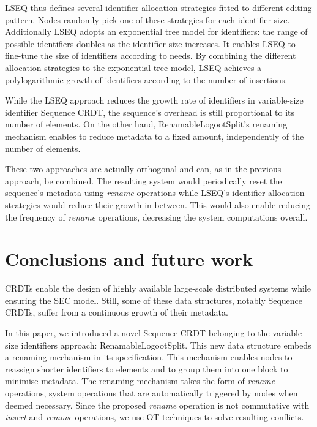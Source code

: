 \documentclass[10pt,journal,compsoc]{IEEEtran}
\begin{document}
LSEQ thus defines several identifier allocation strategies fitted to different editing pattern.
Nodes randomly pick one of these strategies for each identifier size.
Additionally LSEQ adopts an exponential tree model for identifiers: the range of possible identifiers doubles as the identifier size increases.
It enables LSEQ to fine-tune the size of identifiers according to needs.
By combining the different allocation strategies to the exponential tree model, LSEQ achieves a polylogarithmic growth of identifiers according to the number of insertions.

While the LSEQ approach reduces the growth rate of identifiers in variable-size identifier Sequence \ac{CRDT}, the sequence's overhead is still proportional to its number of elements.
On the other hand, RenamableLogootSplit's renaming mechanism enables to reduce metadata to a fixed amount, independently of the number of elements.

These two approaches are actually orthogonal and can, as in the previous approach, be combined.
The resulting system would periodically reset the sequence's metadata using \emph{rename} operations while LSEQ's identifier allocation strategies would reduce their growth in-between.
This would also enable reducing the frequency of \emph{rename} operations, decreasing the system computations overall.

\section{Conclusions and future work}
\label{sec:conclusion}

\acfp{CRDT} enable the design of highly available large-scale distributed systems while ensuring the \acf{SEC} model.
Still, some of these data structures, notably Sequence \acp{CRDT}, suffer from a continuous growth of their metadata.

In this paper, we introduced a novel Sequence \ac{CRDT} belonging to the variable-size identifiers approach: RenamableLogootSplit.
This new data structure embeds a renaming mechanism in its specification.
This mechanism enables nodes to reassign shorter identifiers to elements and to group them into one block to minimise metadata.
The renaming mechanism takes the form of \emph{rename} operations, system operations that are automatically triggered by nodes when deemed necessary.
Since the proposed \emph{rename} operation is not commutative with \emph{insert} and \emph{remove} operations, we use \ac{OT} techniques to solve resulting conflicts.
\end{document}

